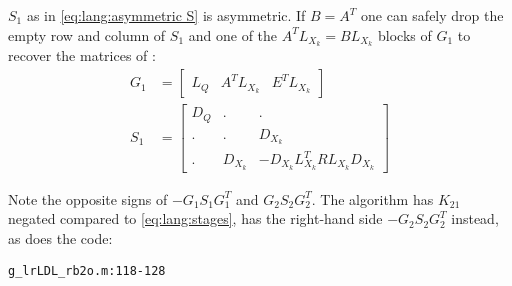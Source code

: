 \begin{remark}
$S_1$ as in \eqref{eq:lang:asymmetric S} is asymmetric.
If $B=A^T$ one can safely drop the empty row and column of $S_1$ and
one of the $A^T L_{X_k} = B L_{X_k}$ blocks of $G_1$ to
recover the matrices of \cite[Equation~(28)]{Lang2015}:
\begin{align*}
  G_1 &= \begin{bmatrix}
    L_Q & A^T L_{X_k} & E^T L_{X_k}
  \end{bmatrix} \\
  S_1 &= \begin{bmatrix}
    D_Q &.&. \\
    .&.& D_{X_k} \\
    .& D_{X_k} & -D_{X_k} L_{X_k}^T R L_{X_k} D_{X_k}
  \end{bmatrix}
\end{align*}
\end{remark}

Note the opposite signs of $-G_1 S_1 G_1^T$ and $G_2 S_2 G_2^T$.
The algorithm \cite[Equation~(12)]{Lang2015} has $K_{21}$ negated compared to \eqref{eq:lang:stages},
\ie has the right-hand side $-G_2 S_2 G_2^T$ instead,
as does the code:
\begin{center}
  \texttt{g\_lrLDL\_rb2o.m:118-128}
\end{center}
